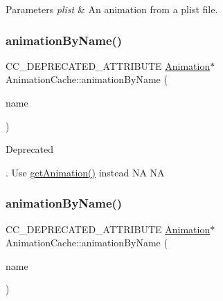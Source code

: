 \begin{DoxyParams}{Parameters}
{\em plist} & An animation from a plist file. \\
\hline
\end{DoxyParams}
\mbox{\label{classAnimationCache_aaf38bd2ec7783124ebe9adfbb146bd23}} 
\subsubsection{\texorpdfstring{animation\+By\+Name()}{animationByName()}\hspace{0.1cm}{\footnotesize\ttfamily [1/2]}}
{\footnotesize\ttfamily C\+C\+\_\+\+D\+E\+P\+R\+E\+C\+A\+T\+E\+D\+\_\+\+A\+T\+T\+R\+I\+B\+U\+TE \hyperlink{classAnimation}{Animation}$\ast$ Animation\+Cache\+::animation\+By\+Name (\begin{DoxyParamCaption}\item[{const std\+::string \&}]{name }\end{DoxyParamCaption})\hspace{0.3cm}{\ttfamily [inline]}}

\begin{DoxyRefDesc}{Deprecated}
\item[\hyperlink{deprecated__deprecated000022}{Deprecated}]. Use \hyperlink{classAnimationCache_ac9674f5e186bcec23f622cd62c1b873a}{get\+Animation()} instead  NA  NA \end{DoxyRefDesc}
\mbox{\label{classAnimationCache_aaf38bd2ec7783124ebe9adfbb146bd23}} 
\subsubsection{\texorpdfstring{animation\+By\+Name()}{animationByName()}\hspace{0.1cm}{\footnotesize\ttfamily [2/2]}}
{\footnotesize\ttfamily C\+C\+\_\+\+D\+E\+P\+R\+E\+C\+A\+T\+E\+D\+\_\+\+A\+T\+T\+R\+I\+B\+U\+TE \hyperlink{classAnimation}{Animation}$\ast$ Animation\+Cache\+::animation\+By\+Name (\begin{DoxyParamCaption}\item[{const std\+::string \&}]{name }\end{DoxyParamCaption})\hspace{0.3cm}{\ttfamily [inline]}}

